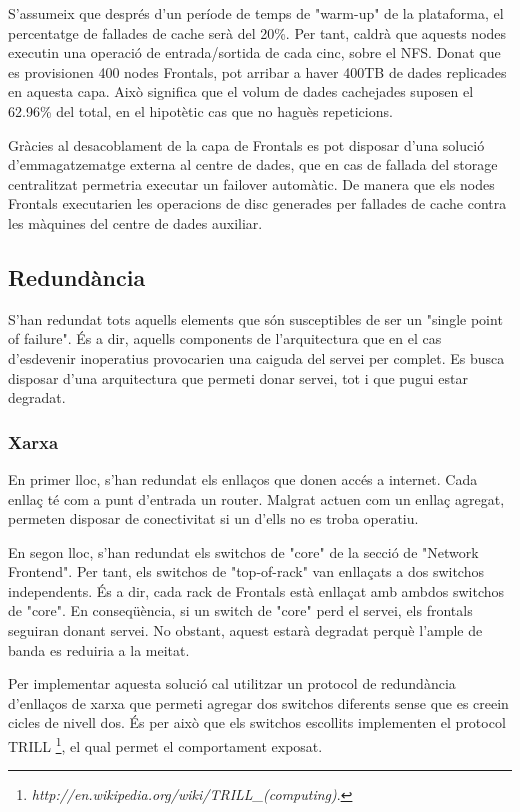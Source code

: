S'assumeix que després d'un període de temps de "warm-up" de la plataforma, el percentatge de fallades de cache serà del 20\%. Per tant, caldrà que aquests nodes executin una operació de entrada/sortida de cada cinc, sobre el NFS. Donat que es provisionen 400 nodes Frontals, pot arribar a haver 400TB de dades replicades en aquesta capa. Això significa que el volum de dades cachejades suposen el 62.96\% del total, en el hipotètic cas que no haguès repeticions.      

Gràcies al desacoblament de la capa de Frontals es pot disposar d'una solució d'emmagatzematge externa al centre de dades, que en cas de fallada del storage centralitzat permetria executar un failover automàtic. De manera que els nodes Frontals executarien les operacions de disc generades per fallades de cache contra les màquines del centre de dades auxiliar. 


\subsection{Redundància}

S'han redundat tots aquells elements que són susceptibles de ser un "single point of failure". És a dir, aquells components de l'arquitectura que en el cas d'esdevenir inoperatius provocarien una caiguda del servei per complet. Es busca disposar d'una arquitectura que permeti donar servei, tot i que pugui estar degradat. 

\subsubsection{Xarxa}
    En primer lloc, s'han redundat els enllaços que donen accés a internet. Cada enllaç té com a punt d'entrada un router. Malgrat actuen com un enllaç agregat, permeten disposar de conectivitat si un d'ells no es troba operatiu.
    
    En segon lloc, s'han redundat els switchos de "core" de la secció de "Network Frontend". Per tant, els switchos de "top-of-rack" van enllaçats a dos switchos independents. És a dir, cada rack de Frontals està enllaçat amb ambdos switchos de "core". En conseqüència, si un switch de "core" perd el servei, els frontals seguiran donant servei. No obstant, aquest estarà degradat perquè l'ample de banda es reduiria a la meitat.
    
    Per implementar aquesta solució cal utilitzar un protocol de redundància d'enllaços de xarxa que permeti agregar dos switchos diferents sense que es creein cicles de nivell dos. És per això que els switchos escollits implementen el protocol TRILL \footnote{\textit{http://en.wikipedia.org/wiki/TRILL\_(computing)}.}, el qual permet el comportament exposat.  
    
